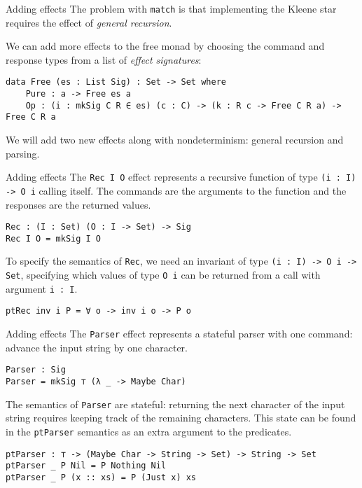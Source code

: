 \documentclass{beamer}
\newcommand{\Agda}[1]{\texttt{\footnotesize #1}\xspace}
\newcommand{\match}{\Agda{match}}
\begin{document}
\begin{frame}[fragile]{Adding effects}
The problem with \match is that implementing the Kleene star requires the effect of \emph{general recursion}.

We can add more effects to the free monad by choosing the command and response types from a list of \emph{effect signatures}:
\begin{verbatim}
data Free (es : List Sig) : Set -> Set where
	Pure : a -> Free es a
	Op : (i : mkSig C R ∈ es) (c : C) -> (k : R c -> Free C R a) -> Free C R a
\end{verbatim}

We will add two new effects along with nondeterminism: general recursion and parsing.
\end{frame}

\begin{frame}[fragile]{Adding effects}
The \Agda{Rec I O} effect represents a recursive function of type \Agda{(i : I) -> O i} calling itself.
The commands are the arguments to the function and the responses are the returned values.
\begin{verbatim}
Rec : (I : Set) (O : I -> Set) -> Sig
Rec I O = mkSig I O
\end{verbatim}
To specify the semantics of \Agda{Rec}, we need an invariant of type \Agda{(i : I) -> O i -> Set},
specifying which values of type \Agda{O i} can be returned from a call with argument \Agda{i : I}.
\begin{verbatim}
ptRec inv i P = ∀ o -> inv i o -> P o
\end{verbatim}
\end{frame}

\begin{frame}[fragile]{Adding effects}
The \Agda{Parser} effect represents a stateful parser with one command:
advance the input string by one character.

\begin{verbatim}
Parser : Sig
Parser = mkSig ⊤ (λ _ -> Maybe Char)
\end{verbatim}

The semantics of \Agda{Parser} are stateful: returning the next character of the input string requires keeping track of the remaining characters.
This state can be found in the \Agda{ptParser} semantics as an extra argument to the predicates.
\begin{verbatim}
ptParser : ⊤ -> (Maybe Char -> String -> Set) -> String -> Set
ptParser _ P Nil = P Nothing Nil
ptParser _ P (x :: xs) = P (Just x) xs
\end{verbatim}

\end{frame}
\end{document}

